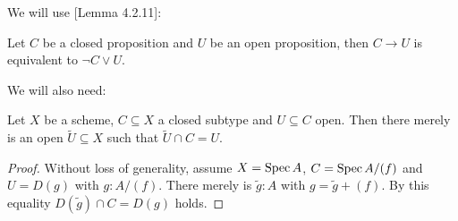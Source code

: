 
We will use \cite{draft}[Lemma 4.2.11]:

\begin{lemma}
  \label{closed-implies-open-to-or}
  Let $C$ be a closed proposition and $U$ be an open proposition,
  then $C\to U$ is equivalent to $\neg C \vee U$.
\end{lemma}

We will also need:

\begin{lemma}
  \label{commute-open-in-closed}
  Let $X$ be a scheme, $C\subseteq X$ a closed subtype and $U\subseteq C$ open.
  Then there merely is an open $\tilde{U}\subseteq X$ such that $\tilde{U}\cap C = U$.
\end{lemma}

\begin{proof}
  Without loss of generality, assume $X=\operatorname{Spec} A$, $C=\operatorname{Spec} A/(f)$ and $U=D(g)$ with $g:A/(f)$.
  There merely is $\tilde{g}:A$ with $g=\tilde{g}+(f)$.
  By this equality $D(\tilde{g})\cap C = D(g)$ holds.
\end{proof}
